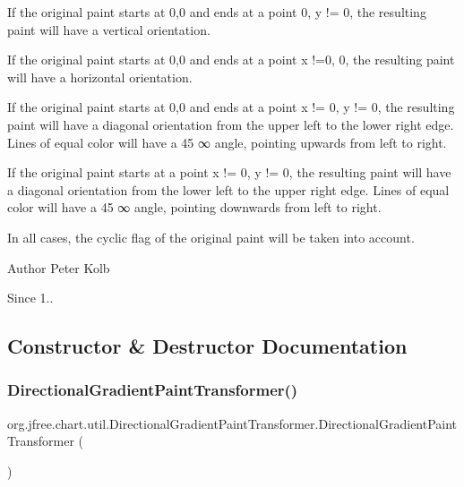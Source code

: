 \begin{DoxyItemize}
\item If the original paint starts at 0,0 and ends at a point 0, y != 0, the resulting paint will have a vertical orientation. 
\item If the original paint starts at 0,0 and ends at a point x !=0, 0, the resulting paint will have a horizontal orientation. 
\item If the original paint starts at 0,0 and ends at a point x != 0, y != 0, the resulting paint will have a diagonal orientation from the upper left to the lower right edge. Lines of equal color will have a 45 ∞ angle, pointing upwards from left to right. 
\item If the original paint starts at a point x != 0, y != 0, the resulting paint will have a diagonal orientation from the lower left to the upper right edge. Lines of equal color will have a 45 ∞ angle, pointing downwards from left to right. 
\end{DoxyItemize}

In all cases, the cyclic flag of the original paint will be taken into account.

\begin{DoxyAuthor}{Author}
Peter Kolb 
\end{DoxyAuthor}
\begin{DoxySince}{Since}
1.. 
\end{DoxySince}


\subsection{Constructor \& Destructor Documentation}
\mbox{\label{classorg_1_1jfree_1_1chart_1_1util_1_1_directional_gradient_paint_transformer_a106ce54a958807e30e1b7ccba4685d8f}} 
\subsubsection{\texorpdfstring{Directional\+Gradient\+Paint\+Transformer()}{DirectionalGradientPaintTransformer()}}
{\footnotesize\ttfamily org.\+jfree.\+chart.\+util.\+Directional\+Gradient\+Paint\+Transformer.\+Directional\+Gradient\+Paint\+Transformer (\begin{DoxyParamCaption}{ }\end{DoxyParamCaption})}

